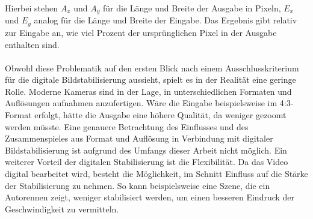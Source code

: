     Hierbei stehen $A_x$ und $A_y$ für die Länge und Breite der Ausgabe in Pixeln, $E_x$ und $E_y$ analog für die Länge und Breite der Eingabe. Das Ergebnis gibt relativ zur Eingabe an, wie viel Prozent der ursprünglichen Pixel in der Ausgabe enthalten sind.
    \\ \\
    Obwohl diese Problematik auf den ersten Blick nach einem Ausschlusskriterium für die digitale Bildstabilisierung aussieht, spielt es in der Realität eine geringe Rolle. Moderne Kameras sind in der Lage, in unterschiedlichen Formaten und Auflösungen aufnahmen anzufertigen. Wäre die Eingabe beispielsweise im 4:3-Format erfolgt, hätte die Ausgabe eine höhere Qualität, da weniger gezoomt werden müsste. Eine genauere Betrachtung des Einflusses und des Zusammenspieles aus Format und Auflösung in Verbindung mit digitaler Bildstabilisierung ist aufgrund des Umfangs dieser Arbeit nicht möglich. Ein weiterer Vorteil der digitalen Stabilisierung ist die Flexibilität. Da das Video digital bearbeitet wird, besteht die Möglichkeit, im Schnitt Einfluss auf die Stärke der Stabilisierung zu nehmen. So kann beispielsweise eine Szene, die ein Autorennen zeigt, weniger stabilisiert werden, um einen besseren Eindruck der Geschwindigkeit zu vermitteln.